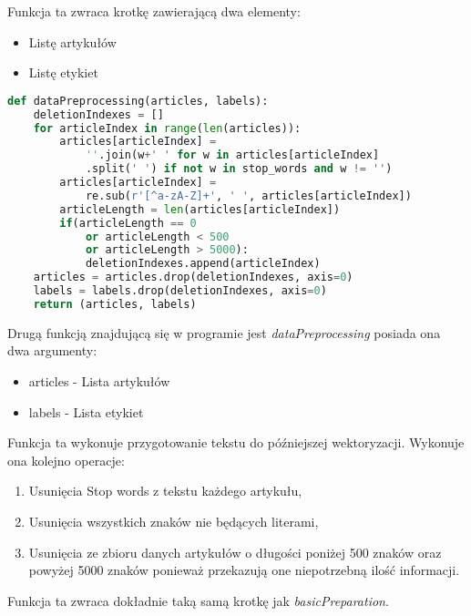 Funkcja ta zwraca krotkę zawierającą dwa elementy:
\begin{itemize}
    \item Listę artykułów
    \item Listę etykiet
\end{itemize} 

\begin{lstlisting}[language=Python, caption={Funkcja przygotowywująca dane tekstowe}, captionpos=b, frame=single]
def dataPreprocessing(articles, labels):
    deletionIndexes = []
    for articleIndex in range(len(articles)):
        articles[articleIndex] = 
            ''.join(w+' ' for w in articles[articleIndex]
            .split(' ') if not w in stop_words and w != '')  
        articles[articleIndex] = 
            re.sub(r'[^a-zA-Z]+', ' ', articles[articleIndex])
        articleLength = len(articles[articleIndex])
        if(articleLength == 0 
            or articleLength < 500 
            or articleLength > 5000):
            deletionIndexes.append(articleIndex) 
    articles = articles.drop(deletionIndexes, axis=0)
    labels = labels.drop(deletionIndexes, axis=0)
    return (articles, labels)

\end{lstlisting}

Drugą funkcją znajdującą się w programie jest \textit{dataPreprocessing} posiada 
ona dwa argumenty:
\begin{itemize}
    \item articles - Lista artykułów
    \item labels - Lista etykiet
\end{itemize}
Funkcja ta wykonuje przygotowanie tekstu do późniejszej wektoryzacji. Wykonuje ona 
kolejno operacje:
\begin{enumerate}
    \item Usunięcia Stop words z tekstu każdego artykułu,
    \item Usunięcia wszystkich znaków nie będących literami,
    \item Usunięcia ze zbioru danych artykułów o długości poniżej 500 znaków oraz powyżej 5000 znaków 
    ponieważ przekazują one niepotrzebną ilość informacji.
\end{enumerate}
Funkcja ta zwraca dokładnie taką samą krotkę jak \textit{basicPreparation}.


